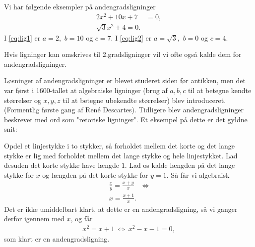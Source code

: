 \documentclass[12pt]{article}
\begin{document}
\begin{exa}
Vi har følgende eksempler på andengradsligninger
\begin{align}
2x^2+10x+7&=0\label{eq:lig1},\\
\sqrt{3}x^2+4=0\label{eq:lig2}.
\end{align}
I \eqref{eq:lig1} er $a=2,$ $b=10$ og $c=7$. I \eqref{eq:lig2} er $a=\sqrt{3},$ $b=0$ og $c=4$. 
\end{exa}
Hvis ligninger kan omskrives til 2.gradsligninger vil vi ofte også kalde dem for andengradsligninger.
\begin{exa}
Løsninger af andengradsligninger er blevet studeret siden før antikken, men det var først i 1600-tallet at algebraiske ligninger (brug af $a,b,c$ til at betegne kendte størrelser og $x,y,z$ til at betegne ubekendte størrelser) blev introduceret. (Formentlig første gang af René Descartes). Tidligere blev andengradsligninger beskrevet med ord som "retoriske ligninger". Et eksempel på dette er det gyldne snit:

Opdel et linjestykke i to stykker, så forholdet mellem det korte og det lange stykke er lig med forholdet mellem det lange stykke og hele linjestykket. Lad desuden det korte stykke have længde $1$. Lad os kalde længden på det lange stykke for $x$ og længden på det korte stykke for $y=1$. Så får vi algebraisk
\begin{align*}
 \frac{x}{y} = \frac{x+y}{x} &\Leftrightarrow\\
 x = \frac{x+1}{x}.
\end{align*}
Det er ikke umiddelbart klart, at dette er en andengradsligning, så vi ganger derfor igennem med $x$, og får
\begin{align*}
x^2 = x+1\  \Leftrightarrow\ x^2-x-1=0,
\end{align*}
som klart er en andengradsligning.
\end{exa}
\end{document}
